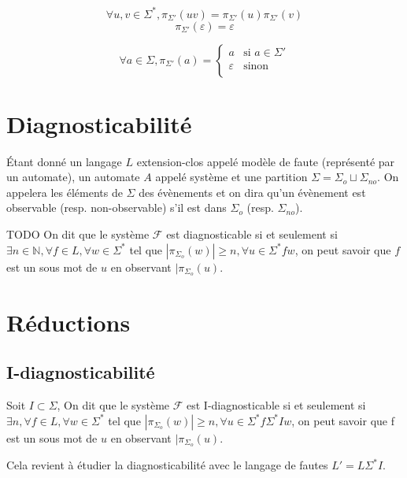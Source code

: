 \documentclass[10pt,a4paper]{article}
\begin{document}
$$\forall u,v \in \Sigma^*, \pi_{\Sigma'}(uv)=\pi_{\Sigma'}(u)\pi_{\Sigma'}(v)$$
$$\pi_{\Sigma'}(\varepsilon)=\varepsilon$$

$$\forall a\in \Sigma,\pi_{\Sigma'}(a)=\left\{\begin{array}{ll}
a &\text{si } a\in \Sigma'\\
\varepsilon &\text{sinon} \\
\end{array}\right.$$

\section{Diagnosticabilit\'e}

\'Etant donn\'e un langage $L$ extension-clos appel\'e mod\`ele de faute (repr\'esent\'e par un automate), un automate $A$ appel\'e syst\`eme et une partition $\Sigma=\Sigma_o\sqcup \Sigma_{no}$. On appelera les \'el\'ements de $\Sigma$ des \'ev\`enements et on dira qu'un \'ev\`enement est observable (resp. non-observable) s'il est dans $\Sigma_o$ (resp. $\Sigma_{no}$).

TODO On dit que le système $\mathcal F$ est diagnosticable si et seulement si $\exists n \in \mathbb N, \forall  f \in L, \forall w \in \Sigma^*$ tel que $|\pi_{\Sigma_o}(w)| \geq n, \forall u \in \Sigma^* f w$, on peut savoir que $f$ est un sous mot de $u$ en observant $|\pi_{\Sigma_o}(u)$. 


\section{R\'eductions}

\subsection{I-diagnosticabilit\'e}


Soit $I \subset \Sigma$, On dit que le système $\mathcal F$ est I-diagnosticable si et seulement si $\exists n, \forall  f \in L, \forall w \in \Sigma^*$ tel que $|\pi_{\Sigma_o}(w)| \geq n, \forall u \in \Sigma^*f \Sigma^* I w$, on peut savoir que f est un sous mot de $u$ en observant $|\pi_{\Sigma_o}(u)$. 


Cela revient à étudier la diagnosticabilité avec le langage de fautes $L'=L \Sigma^* I$.

\end{document}
